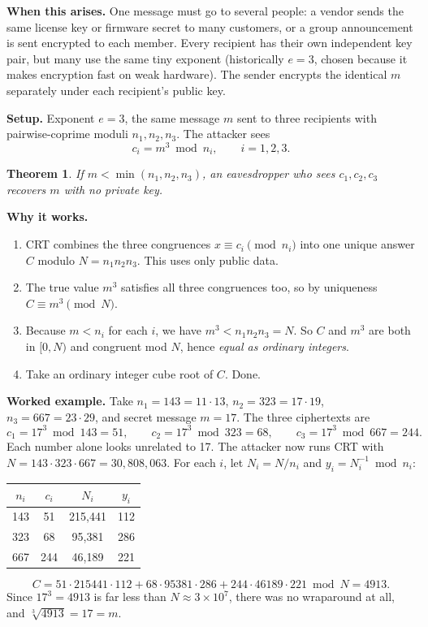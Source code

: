 \documentclass[11pt]{article}
\newtheorem{theorem}{Theorem}
\begin{document}
\textbf{When this arises.} One message must go to several people: a vendor sends the same license key or firmware secret to many customers, or a group announcement is sent encrypted to each member. Every recipient has their own independent key pair, but many use the same tiny exponent (historically $e=3$, chosen because it makes encryption fast on weak hardware). The sender encrypts the identical $m$ separately under each recipient's public key.

\textbf{Setup.} Exponent $e=3$, the same message $m$ sent to three recipients with pairwise-coprime moduli $n_1,n_2,n_3$. The attacker sees
\[
c_i = m^3 \bmod n_i, \qquad i=1,2,3.
\]

\begin{theorem}
If $m<\min(n_1,n_2,n_3)$, an eavesdropper who sees $c_1,c_2,c_3$ recovers $m$ with no private key.
\end{theorem}

\textbf{Why it works.}
\begin{enumerate}[nosep]
\item CRT combines the three congruences $x\equiv c_i \pmod{n_i}$ into one unique answer $C$ modulo $N=n_1n_2n_3$. This uses only public data.
\item The true value $m^3$ satisfies all three congruences too, so by uniqueness $C\equiv m^3 \pmod N$.
\item Because $m<n_i$ for each $i$, we have $m^3<n_1n_2n_3=N$. So $C$ and $m^3$ are both in $[0,N)$ and congruent mod $N$, hence \emph{equal as ordinary integers}.
\item Take an ordinary integer cube root of $C$. Done.
\end{enumerate}

\textbf{Worked example.} Take $n_1=143=11\cdot13$, $n_2=323=17\cdot19$, $n_3=667=23\cdot29$, and secret message $m=17$. The three ciphertexts are
\[
c_1=17^3\bmod143=51,\qquad c_2=17^3\bmod323=68,\qquad c_3=17^3\bmod667=244.
\]
Each number alone looks unrelated to 17. The attacker now runs CRT with $N=143\cdot323\cdot667=30{,}808{,}063$. For each $i$, let $N_i=N/n_i$ and $y_i=N_i^{-1}\bmod n_i$:
\begin{center}
\begin{tabular}{@{}cccc@{}}
\toprule
$n_i$ & $c_i$ & $N_i$ & $y_i$ \\
\midrule
143 & 51 & 215{,}441 & 112 \\
323 & 68 & 95{,}381 & 286 \\
667 & 244 & 46{,}189 & 221 \\
\bottomrule
\end{tabular}
\end{center}
\[
C = 51\cdot215441\cdot112 + 68\cdot95381\cdot286 + 244\cdot46189\cdot221 \bmod N = 4913.
\]
Since $17^3=4913$ is far less than $N\approx 3\times10^7$, there was no wraparound at all, and $\sqrt[3]{4913}=17=m$.
\end{document}

